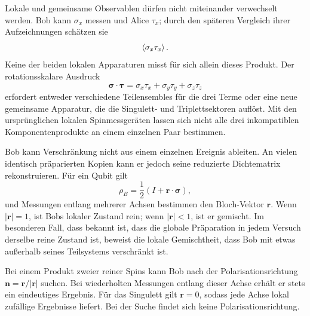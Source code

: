 Lokale und gemeinsame Observablen dürfen nicht miteinander verwechselt werden. Bob kann \(\sigma_x\) messen und Alice \(\tau_x\); durch den späteren Vergleich ihrer Aufzeichnungen schätzen sie
\begin{equation}
\left\langle\sigma_x\tau_x\right\rangle.
\end{equation}
Keine der beiden lokalen Apparaturen misst für sich allein dieses Produkt. Der rotationsskalare Ausdruck
\begin{equation}
\boldsymbol{\sigma}\cdot\boldsymbol{\tau}
=\sigma_x\tau_x+\sigma_y\tau_y+\sigma_z\tau_z
\end{equation}
erfordert entweder verschiedene Teilensembles für die drei Terme oder eine neue gemeinsame Apparatur, die die Singulett- und Triplettsektoren auflöst. Mit den ursprünglichen lokalen Spinmessgeräten lassen sich nicht alle drei inkompatiblen Komponentenprodukte an einem einzelnen Paar bestimmen.

\begin{classroomqa}
\end{classroomqa}

Bob kann Verschränkung nicht aus einem einzelnen Ereignis ableiten. An vielen identisch präparierten Kopien kann er jedoch seine reduzierte Dichtematrix rekonstruieren. Für ein Qubit gilt
\begin{equation}
\rho_B
=\frac12\left(
I+\mathbf r\cdot\boldsymbol{\sigma}
\right),
\label{eq:l7-bloch-density}
\end{equation}
und Messungen entlang mehrerer Achsen bestimmen den Bloch-Vektor \(\mathbf r\). Wenn \(|\mathbf r|=1\), ist Bobs lokaler Zustand rein; wenn \(|\mathbf r|<1\), ist er gemischt. Im besonderen Fall, dass bekannt ist, dass die globale Präparation in jedem Versuch derselbe reine Zustand ist, beweist die lokale Gemischtheit, dass Bob mit etwas außerhalb seines Teilsystems verschränkt ist.

Bei einem Produkt zweier reiner Spins kann Bob nach der Polarisationsrichtung \(\mathbf n=\mathbf r/|\mathbf r|\) suchen. Bei wiederholten Messungen entlang dieser Achse erhält er stets ein eindeutiges Ergebnis. Für das Singulett gilt \(\mathbf r=0\), sodass jede Achse lokal zufällige Ergebnisse liefert. Bei der Suche findet sich keine Polarisationsrichtung.

